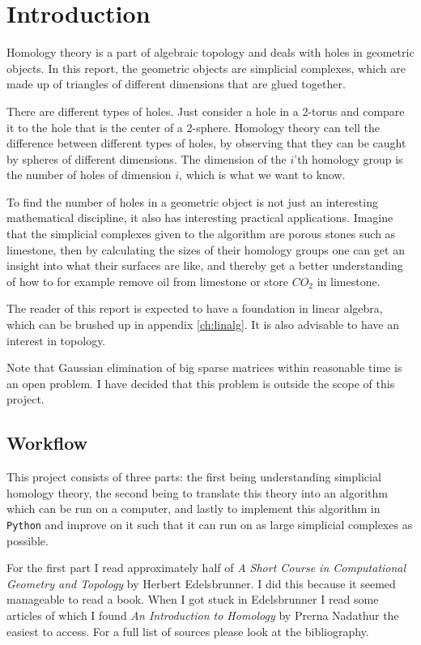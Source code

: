 \documentclass[11pt,a4paper,twoside]{report}
\begin{document}
\chapter*{Introduction}
Homology theory is a part of algebraic topology and deals with holes in geometric objects. In this report, the geometric objects are simplicial complexes, which are made up of triangles of different dimensions that are glued together.

There are different types of holes. Just consider a hole in a 2-torus and compare it to the hole that is the center of a 2-sphere. Homology theory can tell the difference between different types of holes, by observing that they can be caught by spheres of different dimensions. The dimension of the $i$'th homology group is the number of holes of dimension $i$, which is what we want to know.

To find the number of holes in a geometric object is not just an interesting mathematical discipline, it also has interesting practical applications. Imagine that the simplicial complexes given to the algorithm are porous stones such as limestone, then by calculating the sizes of their homology groups one can get an insight into what their surfaces are like, and thereby get a better understanding of how to for example remove oil from limestone or store $CO_2$ in limestone. 

The reader of this report is expected to have a foundation in linear algebra, which can be brushed up in appendix \ref{ch:linalg}. It is also advisable to have an interest in topology.

Note that Gaussian elimination of big sparse matrices within reasonable time is an open problem. I have decided that this problem is outside the scope of this project.
\newpage
\section*{Workflow}
This project consists of three parts: the first being understanding simplicial homology theory, the second being to translate this theory into an algorithm which can be run on a computer, and lastly to implement this algorithm in \texttt{Python} and improve on it such that it can run on as large simplicial complexes as possible.

For the first part I read approximately half of \emph{A Short Course in Computational Geometry and Topology} by Herbert Edelsbrunner\cite{Edelsbrunner}. I did this because it seemed manageable to read a book. When I got stuck in Edelsbrunner I read some articles of which I found \emph{An Introduction to Homology} by Prerna Nadathur \cite{Nadathur} the easiest to access. For a full list of sources please look at the bibliography.
\end{document}
